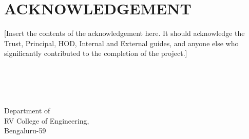 \chapter*{ACKNOWLEDGEMENT}

[Insert the contents of the acknowledgement here. It should acknowledge the Trust, Principal, HOD, Internal and External guides, and anyone else who significantly contributed to the completion of the project.]

\vspace{2cm}
\begin{flushright}
\textbf{\studentNameA}\\
\textbf{\studentNameB}\\
\textbf{\studentNameC}\\
\textbf{\studentNameD}\\
Department of \branchName \\
RV College of Engineering, \\
Bengaluru-59
\end{flushright}